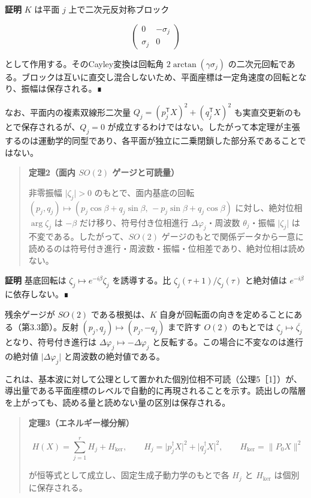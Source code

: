 \documentclass[
  a4paper,
]{ltjsarticle}
\begin{document}
\textbf{証明} \(K\) は平面 \(j\) 上で二次元反対称ブロック

\[
\begin{pmatrix}0&-\sigma_j\\\sigma_j&0\end{pmatrix}
\]

として作用する。そのCayley変換は回転角 \(2\arctan(\gamma\sigma_j)\)
の二次元回転である。ブロックは互いに直交し混合しないため、平面座標は一定角速度の回転となり、振幅は保存される。∎

なお、平面内の複素双線形二次量
\(Q_j=(p_j^{\mathsf T}X)^2+(q_j^{\mathsf T}X)^2\)
も実直交更新のもとで保存されるが、\(Q_j=0\)
が成立するわけではない。したがって本定理が主張するのは運動学的同型であり、各平面が独立に二乗閉鎖した部分系であることではない。

\begin{quote}
\textbf{定理2（面内 \(SO(2)\) ゲージと可読量）}

非零振幅 \(\lvert\zeta_j\rvert>0\) のもとで、面内基底の回転
\((p_j,q_j)\mapsto(p_j\cos\beta+q_j\sin\beta,\,-p_j\sin\beta+q_j\cos\beta)\)
に対し、絶対位相 \(\arg\zeta_j\) は \(-\beta\)
だけ移り、符号付き位相進行 \(\Delta\varphi_j\)・周波数
\(\theta_j\)・振幅 \(\lvert\zeta_j\rvert\)
は不変である。したがって、\(SO(2)\)
ゲージのもとで関係データから一意に読めるのは符号付き進行・周波数・振幅・位相差であり、絶対位相は読めない。
\end{quote}

\textbf{証明} 基底回転は \(\zeta_j\mapsto e^{-i\beta}\zeta_j\)
を誘導する。比 \(\zeta_j(\tau+1)/\zeta_j(\tau)\) と絶対値は
\(e^{-i\beta}\) に依存しない。∎

残余ゲージが \(SO(2)\) である根拠は、\(K\)
自身が回転面の向きを定めることにある（第3.3節）。反射
\((p_j,q_j)\mapsto(p_j,-q_j)\) まで許す \(O(2)\) のもとでは
\(\zeta_j\mapsto\overline{\zeta_j}\) となり、符号付き進行は
\(\Delta\varphi_j\mapsto-\Delta\varphi_j\)
と反転する。この場合に不変なのは進行の絶対値
\(\lvert\Delta\varphi_j\rvert\) と周波数の絶対値である。

これは、基本波に対して公理として置かれた個別位相不可読（公理5［1］）が、導出量である平面座標のレベルで自動的に再現されることを示す。読出しの階層を上がっても、読める量と読めない量の区別は保存される。

\begin{quote}
\textbf{定理3（エネルギー様分解）}

\[
H(X)=\sum_{j=1}^{r}H_j+H_{\ker},
\qquad
H_j=\lvert p_j^\dagger X\rvert^2+\lvert q_j^\dagger X\rvert^2,
\qquad
H_{\ker}=\lVert P_0X\rVert^2
\]

が恒等式として成立し、固定生成子動力学のもとで各 \(H_j\) と \(H_{\ker}\)
は個別に保存される。
\end{quote}
\end{document}
